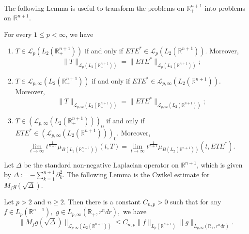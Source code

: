 \documentclass[12pt]{amsart}
\begin{document}
The following Lemma is useful to transform the problems on $\mathbb{R}_+^{n+1}$ into problems on $\mathbb{R}^{n+1}$.
\begin{lemma}\label{half}
For every $1\leq p<\infty$, we have
\begin{enumerate}[{\rm (i)}]
\item $T\in\mathcal{L}_{p}(L_2(\mathbb{R}_+^{n+1}))$ if and only if $ETE^{\ast}\in\mathcal{L}_{p}(L_2(\mathbb{R}^{n+1}))$. Moreover,
$$\|T\|_{\mathcal{L}_{p}(L_2(\mathbb{R}_+^{n+1}))}=\|ETE^{\ast}\|_{\mathcal{L}_{p}(L_2(\mathbb{R}^{n+1}))};$$
\item $T\in\mathcal{L}_{p,\infty}(L_2(\mathbb{R}_+^{n+1}))$ if and only if $ETE^{\ast}\in\mathcal{L}_{p,\infty}(L_2(\mathbb{R}^{n+1}))$. Moreover,
$$\|T\|_{\mathcal{L}_{p,\infty}(L_2(\mathbb{R}_+^{n+1}))}=\|ETE^{\ast}\|_{\mathcal{L}_{p,\infty}(L_2(\mathbb{R}^{n+1}))};$$
\item $T\in(\mathcal{L}_{p,\infty}(L_2(\mathbb{R}_+^{n+1})))_0$ if and only if $ETE^{\ast}\in(\mathcal{L}_{p,\infty}(L_2(\mathbb{R}^{n+1})))_0.$ Moreover,
$$\lim_{t\to\infty}t^{\frac1{n+1}}\mu_{B(L_2(\mathbb{R}_+^{n+1}))}(t,T)=\lim_{t\to\infty}t^{\frac1{n+1}}\mu_{B(L_2(\mathbb{R}^{n+1}))}(t,ETE^{\ast}).$$
\end{enumerate}
\end{lemma}
Let $\Delta$ be the standard non-negative Laplacian operator on $\mathbb{R}^{n+1}$, which is given by $\Delta:=-\sum_{k=1}^{n+1}\partial_{k}^2$.  The following Lemma is the Cwikel estimate for $M_fg(\sqrt{\Delta})$.
\begin{lemma}{\color{blue}\cite[Theorem 4.2]{MR2154153}}\label{cwikel estimate in Euclidean setting}
Let $p>2$ and $n\geq 2.$ Then there is a constant $C_{n,p}>0$ such that for any $f\in L_p(\mathbb{R}^{n+1}),$ $g\in L_{p,\infty}(\mathbb{R}_+,r^ndr),$ we have
$$\|M_fg(\sqrt{\Delta})\|_{\mathcal{L}_{p,\infty}(L_2(\mathbb{R}^{n+1}))}\leq C_{n,p}\|f\|_{L_p(\mathbb{R}^{n+1})}\|g\|_{L_{p,\infty}(\mathbb{R}_+,r^ndr)}.$$
\end{lemma}
\end{document}
